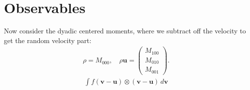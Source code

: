 \documentclass{article}
\begin{document}
\section{Observables}
Now consider the dyadic centered moments, where we subtract off the velocity to get the random velocity part:
\begin{align*}
    \rho = M_{000}, \quad 
    \rho \bm{u} = \begin{pmatrix}
        M_{100} \\ M_{010} \\ M_{001}
    \end{pmatrix}.
\end{align*}
\begin{align*}
\int f (\bm{v} - \bm{u}) \otimes (\bm{v} - \bm{u})\,d \bm{v}
\end{align*}
\end{document}
